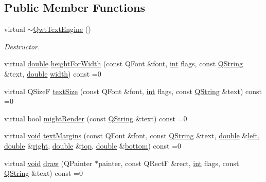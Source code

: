 \subsection*{Public Member Functions}
\begin{DoxyCompactItemize}
\item 
virtual \hyperlink{class_qwt_text_engine_adda9e23494429c54b3cc3452940fb2bc}{$\sim$\-Qwt\-Text\-Engine} ()
\begin{DoxyCompactList}\small\item\em Destructor. \end{DoxyCompactList}\item 
virtual \hyperlink{_super_l_u_support_8h_a8956b2b9f49bf918deed98379d159ca7}{double} \hyperlink{class_qwt_text_engine_aee891b14d90c817b8c73d551f623cc17}{height\-For\-Width} (const Q\-Font \&font, \hyperlink{ioapi_8h_a787fa3cf048117ba7123753c1e74fcd6}{int} flags, const \hyperlink{group___u_a_v_objects_plugin_gab9d252f49c333c94a72f97ce3105a32d}{Q\-String} \&text, \hyperlink{_super_l_u_support_8h_a8956b2b9f49bf918deed98379d159ca7}{double} \hyperlink{glext_8h_a76aaa5c50746272e7d2de9aece921757}{width}) const =0
\item 
virtual Q\-Size\-F \hyperlink{class_qwt_text_engine_ad9382cc8ff22c6b3e448fce566a76178}{text\-Size} (const Q\-Font \&font, \hyperlink{ioapi_8h_a787fa3cf048117ba7123753c1e74fcd6}{int} flags, const \hyperlink{group___u_a_v_objects_plugin_gab9d252f49c333c94a72f97ce3105a32d}{Q\-String} \&text) const =0
\item 
virtual bool \hyperlink{class_qwt_text_engine_a98316f2f6f4f50216ceffbe9babe2901}{might\-Render} (const \hyperlink{group___u_a_v_objects_plugin_gab9d252f49c333c94a72f97ce3105a32d}{Q\-String} \&text) const =0
\item 
virtual \hyperlink{group___u_a_v_objects_plugin_ga444cf2ff3f0ecbe028adce838d373f5c}{void} \hyperlink{class_qwt_text_engine_a83c8d3dc590b9914e9216c01e78e0838}{text\-Margins} (const Q\-Font \&font, const \hyperlink{group___u_a_v_objects_plugin_gab9d252f49c333c94a72f97ce3105a32d}{Q\-String} \&text, \hyperlink{_super_l_u_support_8h_a8956b2b9f49bf918deed98379d159ca7}{double} \&\hyperlink{glext_8h_a85b8f6c07fbc1fb5d77c2ae090f21995}{left}, \hyperlink{_super_l_u_support_8h_a8956b2b9f49bf918deed98379d159ca7}{double} \&\hyperlink{glext_8h_a5ffadbbacc6b89cf6218bc43b384d3fe}{right}, \hyperlink{_super_l_u_support_8h_a8956b2b9f49bf918deed98379d159ca7}{double} \&\hyperlink{glext_8h_a5ab323daeacf8dfdb8f91132fecdca23}{top}, \hyperlink{_super_l_u_support_8h_a8956b2b9f49bf918deed98379d159ca7}{double} \&\hyperlink{glext_8h_a95fc257e5ddf46f7db9d5e898cdf1991}{bottom}) const =0
\item 
virtual \hyperlink{group___u_a_v_objects_plugin_ga444cf2ff3f0ecbe028adce838d373f5c}{void} \hyperlink{class_qwt_text_engine_ad727f58f9eebfec86369e7f2e5bf6a59}{draw} (Q\-Painter $\ast$painter, const Q\-Rect\-F \&rect, \hyperlink{ioapi_8h_a787fa3cf048117ba7123753c1e74fcd6}{int} flags, const \hyperlink{group___u_a_v_objects_plugin_gab9d252f49c333c94a72f97ce3105a32d}{Q\-String} \&text) const =0
\end{DoxyCompactItemize}
